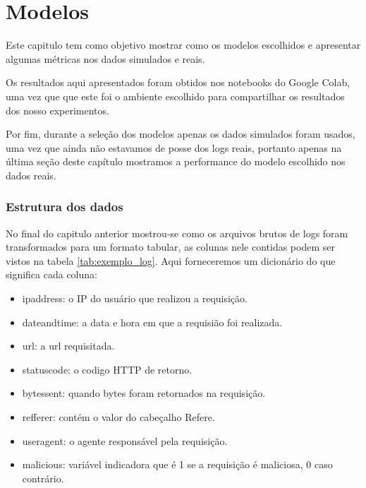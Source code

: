 
\chapter{Modelos}
\label{cap:models}

Este capitulo tem como objetivo mostrar como os modelos escolhidos e apresentar
algumas métricas nos dados simulados e reais.

Os resultados aqui apresentados foram obtidos nos notebooks do Google Colab, uma vez que 
que este foi o ambiente escolhido para compartilhar os resultados dos nosso experimentos. 

Por fim, durante a seleção dos modelos apenas os dados simulados foram usados, uma vez
que ainda não estavamos de posse dos logs reais, portanto apenas na última seção deste capítulo
mostramos a performance do modelo escolhido nos dados reais.


\subsection{Estrutura dos dados}

No final do capitulo anterior mostrou-se como os arquivos brutos de logs foram transformados
para um formato tabular, as colunas nele contidas podem ser vistos na tabela \ref{tab:exemplo_log}. 
Aqui forneceremos um dicionário do que significa cada coluna:


\begin{itemize}
    \item ipaddress: o IP do usuário que realizou a requisição.
    \item dateandtime: a data e hora em que a requisião foi realizada.
    \item url: a url requisitada.
    \item statuscode: o codigo HTTP de retorno.
    \item bytessent: quando bytes foram retornados na requisição.
    \item refferer: contém o valor do cabeçalho Refere.
    \item useragent: o agente responsável pela requisição.
    \item malicious: variável indicadora que é 1 se a requisição é maliciosa, 0 caso contrário.
\end{itemize}


